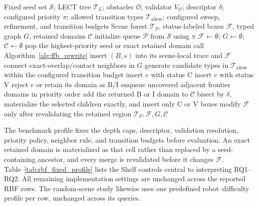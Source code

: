 \documentclass[journal]{IEEEtran}
\newcommand{\calO}{\ensuremath{\mathcal{O}}}
\newcommand{\StatusC}{\ensuremath{\mathrm{C}}}
\newcommand{\StatusV}{\ensuremath{\mathrm{V}}}
\newcommand{\StatusB}{\ensuremath{\mathrm{B}}}
\newcommand{\StatusI}{\ensuremath{\mathrm{I}}}
\begin{document}
\begin{algorithm}[!t]
\caption{Adaptive forest sweep, refinement, and typed-graph construction.}
\label{alg:leaf_sweep_refine}
\footnotesize
\begin{algorithmic}[1]
\REQUIRE Fixed seed set $\mathcal{S}$; LECT tree $\mathcal{T}_L$; obstacles
$\calO$; validator $V_{\calO}$; descriptor $\delta$; configured priority $\pi$;
allowed transition types $\mathcal{T}_{\mathrm{allow}}$; configured sweep,
refinement, and transition budgets
\ENSURE Scene forest $\mathcal{T}_F$, status-labeled boxes $\mathcal{F}$,
typed graph $G$, retained domains $\mathcal{C}$
\STATE initialize queue $\mathcal{P}$ from $\mathcal{S}$ using $\pi$
\STATE $\mathcal{F}\leftarrow\emptyset$; $G\leftarrow\emptyset$;
$\mathcal{C}\leftarrow\emptyset$
  \STATE pop the highest-priority seed or exact retained domain
  \STATE call Algorithm~\ref{alg:ffb_rewrite}
  \IF{a box $B$ with status $s\in\{\StatusC,\StatusV\}$ is returned}
    \STATE insert $(B,s)$ into its scene-local trace and $\mathcal{F}$
    \STATE connect exact-overlap/contact neighbors in $G$
    \STATE generate candidate types in $\mathcal{T}_{\mathrm{allow}}$ within the
    configured transition budget
        \STATE insert $e$ with status $\StatusC$
        \STATE insert $e$ with status $\StatusV$
      \ELSE
        \STATE reject $e$ or retain its domain as $\StatusB$/$\StatusI$
      \ENDIF
    \ENDFOR
    \STATE enqueue uncovered adjacent frontier domains in priority order
  \ELSE
    \STATE add the returned $\StatusB$ or $\StatusI$ domain to $\mathcal{C}$
  \ENDIF
\ENDWHILE
{}
  \STATE bisect by $\delta$, materialize the selected children exactly, and
  insert only $\StatusC$ or $\StatusV$ boxes
\ENDFOR
{}
  \STATE modify $\mathcal{F}$ only after revalidating the retained region
\ENDFOR
\RETURN $\mathcal{T}_F,\mathcal{F},G,\mathcal{C}$
\end{algorithmic}
\end{algorithm}

The benchmark profile fixes the depth caps, descriptor, validation
resolution, priority policy, neighbor rule, and transition budgets before
evaluation. An exact retained domain is materialized as that cell rather than
replaced by a seed-containing ancestor, and every merge is revalidated before
it changes $\mathcal{F}$. Table~\ref{tab:rbf_fixed_profile} lists the Shelf
controls central to interpreting RQ1--RQ2. All remaining implementation settings
are unchanged across the reported RBF rows. The random-scene study likewise
uses one predefined robot--difficulty profile per row, unchanged across its
queries.
\end{document}
